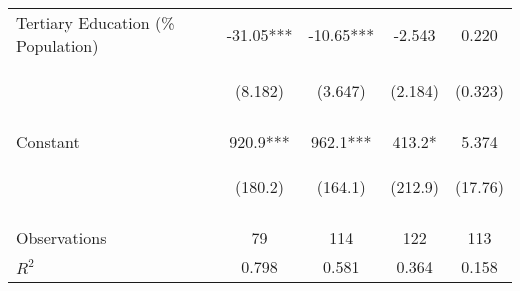 \begin{subtables}
\begin{table}[htpb!]
\begin{center}
\begin{tabular}{lcccc}
Tertiary Education (\% Population)	&	-31.05***	&	-10.65***	&	-2.543	&	0.220	\\
	& \begin{footnotesize}	(8.182)	\end{footnotesize} & \begin{footnotesize}	(3.647)	\end{footnotesize} & \begin{footnotesize}	(2.184)	\end{footnotesize} & \begin{footnotesize}	(0.323)	\end{footnotesize} \\
	& \begin{footnotesize}		\end{footnotesize} & \begin{footnotesize}		\end{footnotesize} & \begin{footnotesize}		\end{footnotesize} & \begin{footnotesize}		\end{footnotesize} \\
Constant	&	920.9***	&	962.1***	&	413.2*	&	5.374	\\
	& \begin{footnotesize}	(180.2)	\end{footnotesize} & \begin{footnotesize}	(164.1)	\end{footnotesize} & \begin{footnotesize}	(212.9)	\end{footnotesize} & \begin{footnotesize}	(17.76)	\end{footnotesize} \\
\vspace{4pt} & \begin{footnotesize}\end{footnotesize} & \begin{footnotesize}\end{footnotesize} & \begin{footnotesize}\end{footnotesize} & \begin{footnotesize}\end{footnotesize}  \\									
Observations	&	79	&	114	&	122	&	113	\\
$R^2$	&	0.798	&	0.581	&	0.364	&	0.158	\\

\end{tabular}
\end{center}
\end{table}
\end{subtables}
